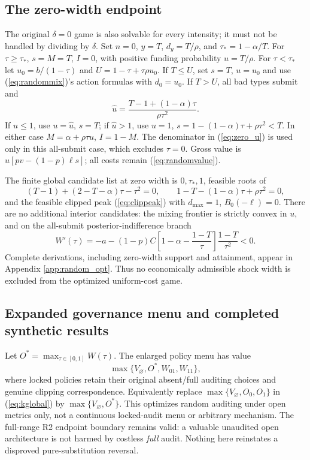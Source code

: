 \documentclass[11pt]{article}
\begin{document}
\subsection{The zero-width endpoint}\label{subsec:random_zero}
The original $\delta=0$ game is also solvable for every intensity; it must not be handled by dividing by $\delta$. Set $n=0$, $y=T$, $d_y=T/\rho$, and $\tau_*=1-\alpha/T$. For $\tau\geq\tau_*$, $s=M=T$, $I=0$, with positive funding probability $u=T/\rho$. For $\tau<\tau_*$ let $u_0=b/(1-\tau)$ and $U=1-\tau+\tau\rho u_0$. If $T\leq U$, set $s=T$, $u=u_0$ and use (\ref{eq:randommix})'s action formulas with $d_0=u_0$. If $T>U$, all bad types submit and
\begin{equation}
\widehat u=\frac{T-1+(1-\alpha)\tau}{\rho\tau^2}.\label{eq:zero_u}
\end{equation}
If $\widehat u\leq1$, use $u=\widehat u$, $s=T$; if $\widehat u>1$, use $u=1$, $s=1-(1-\alpha)\tau+\rho\tau^2<T$. In either case $M=\alpha+\rho\tau u$, $I=1-M$. The denominator in (\ref{eq:zero_u}) is used only in this all-submit case, which excludes $\tau=0$. Gross value is $u[pv-(1-p)\ell s]$; all costs remain (\ref{eq:randomvalue}).

The finite global candidate list at zero width is $0,\tau_*,1$, feasible roots of
\begin{equation}
(T-1)+(2-T-\alpha)\tau-\tau^2=0,\qquad
1-T-(1-\alpha)\tau+\rho\tau^2=0,\label{eq:zero_boundaries}
\end{equation}
and the feasible clipped peak (\ref{eq:clippeak}) with $d_{\max}=1$, $B_0(-\ell)=0$. There are no additional interior candidates: the mixing frontier is strictly convex in $u$, and on the all-submit posterior-indifference branch
\begin{equation}
W'(\tau)=-a-(1-p)C\left[1-\alpha-\frac{1-T}{\tau}\right]\frac{1-T}{\tau^2}<0.\label{eq:zero_decreasing}
\end{equation}
Complete derivations, including zero-width support and attainment, appear in Appendix \ref{app:random_opt}. Thus no economically admissible shock width is excluded from the optimized uniform-cost game.

\subsection{Expanded governance menu and completed synthetic results}\label{subsec:random_results}
Let $O^*=\max_{\tau\in[0,1]}W(\tau)$. The enlarged policy menu has value
\begin{equation}\max\{V_\varnothing,O^*,W_{01},W_{11}\},\label{eq:newmenu}\end{equation}
where locked policies retain their original absent/full auditing choices and genuine clipping correspondence. Equivalently replace $\max\{V_\varnothing,O_0,O_1\}$ in (\ref{eq:kglobal}) by $\max\{V_\varnothing,O^*\}$. This optimizes random auditing under open metrics only, not a continuous locked-audit menu or arbitrary mechanism. The full-range R2 endpoint boundary remains valid: a valuable unaudited open architecture is not harmed by costless \emph{full} audit. Nothing here reinstates a disproved pure-substitution reversal.
\end{document}
